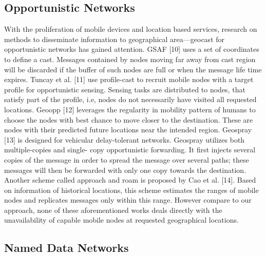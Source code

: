 \documentclass[10pt, conference, compsocconf]{IEEEtran}
\begin{document}
\subsection{Opportunistic Networks}
With the proliferation of mobile devices and location based services, research on methods to disseminate information to geographical area—geocast for opportunistic networks has gained attention. GSAF [10] uses a set of coordinates to deﬁne a cast. Messages contained by nodes moving far away from cast region will be discarded if the buffer of such nodes are full or when the message life time expires. Tuncay et al. [11] use proﬁle-cast to recruit mobile nodes with a target proﬁle for opportunistic sensing. Sensing tasks are distributed to nodes, that satisfy part of the proﬁle, i.e, nodes do not necessarily have visited all requested locations. Geoopp [12] leverages the regularity in mobility pattern of humans to choose the nodes with best chance to move closer to the destination. These are nodes with their predicted future locations near the intended region. Geospray [13] is designed for vehicular delay-tolerant networks. Geospray utilizes both multiple-copies and single- copy opportunistic forwarding. It ﬁrst injects several copies of the message in order to spread the message over several paths; these messages will then be forwarded with only one copy towards the destination. Another scheme called approach and roam is proposed by Cao et al. [14]. Based on information of historical locations, this scheme estimates the ranges of mobile nodes and replicates messages only within this range. However compare to our approach, none of these aforementioned works deals directly with the unavailability of capable mobile nodes at requested geographical locations.


\subsection{Named Data Networks}
\end{document}

